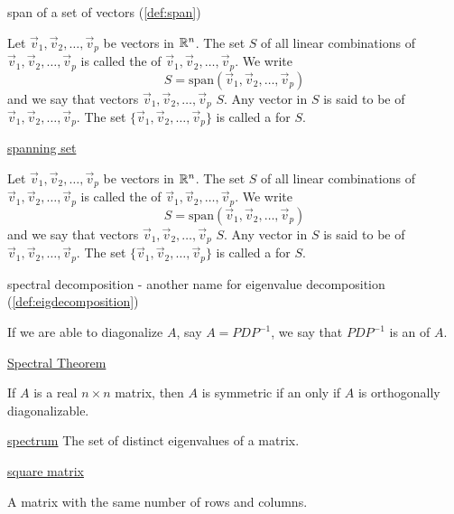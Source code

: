 \documentclass{ximera}
\begin{document}
span of a set of vectors (\ref{def:span})
\begin{expandable}{}{}
    Let $\vec{v}_1, \vec{v}_2,\ldots ,\vec{v}_p$ be vectors in $\mathbb{R}^n$.  The set $S$ of all linear combinations of $\vec{v}_1, \vec{v}_2,\ldots ,\vec{v}_p$ is called the  of $\vec{v}_1, \vec{v}_2,\ldots ,\vec{v}_p$.  We write 
$$S=\mbox{span}(\vec{v}_1, \vec{v}_2,\ldots ,\vec{v}_p)$$
and we say that vectors $\vec{v}_1, \vec{v}_2,\ldots ,\vec{v}_p$  $S$.  Any vector in $S$ is said to be  of $\vec{v}_1, \vec{v}_2,\ldots ,\vec{v}_p$.  The set $\{\vec{v}_1, \vec{v}_2,\ldots ,\vec{v}_p\}$ is called a  for $S$.
\end{expandable}

\href{https://ximera.osu.edu/linearalgebradzv3/LinearAlgebraInteractiveIntro/VEC-0090/main}{spanning set}
\begin{expandable}{}{}
    Let $\vec{v}_1, \vec{v}_2,\ldots ,\vec{v}_p$ be vectors in $\mathbb{R}^n$.  The set $S$ of all linear combinations of $\vec{v}_1, \vec{v}_2,\ldots ,\vec{v}_p$ is called the  of $\vec{v}_1, \vec{v}_2,\ldots ,\vec{v}_p$.  We write 
$$S=\mbox{span}(\vec{v}_1, \vec{v}_2,\ldots ,\vec{v}_p)$$
and we say that vectors $\vec{v}_1, \vec{v}_2,\ldots ,\vec{v}_p$  $S$.  Any vector in $S$ is said to be  of $\vec{v}_1, \vec{v}_2,\ldots ,\vec{v}_p$.  The set $\{\vec{v}_1, \vec{v}_2,\ldots ,\vec{v}_p\}$ is called a  for $S$.
\end{expandable}

spectral decomposition - another name for eigenvalue decomposition (\ref{def:eigdecomposition})
\begin{expandable}{}{}
    If we are able to diagonalize $A$, say $A=PDP^{-1}$, we say that $PDP^{-1}$ is an  of $A$.
\end{expandable}

\href{https://ximera.osu.edu/linearalgebradzv3/LinearAlgebraInteractiveIntro/RTH-0035/main}{Spectral Theorem}
\begin{expandable}{}{}
    If $A$ is a real $n \times n$ matrix, then $A$ is symmetric if an only if $A$ is orthogonally diagonalizable.
\end{expandable}

\href{https://ximera.osu.edu/linearalgebradzv3/LinearAlgebraInteractiveIntro/RTH-0035/main}{spectrum} 
The set of distinct eigenvalues of a matrix.


\href{https://ximera.osu.edu/linearalgebradzv3/LinearAlgebraInteractiveIntro/MAT-0010/main}
{square matrix}
\begin{expandable}{}{}
    A matrix with the same number of rows and columns.
\end{expandable}
\end{document}
